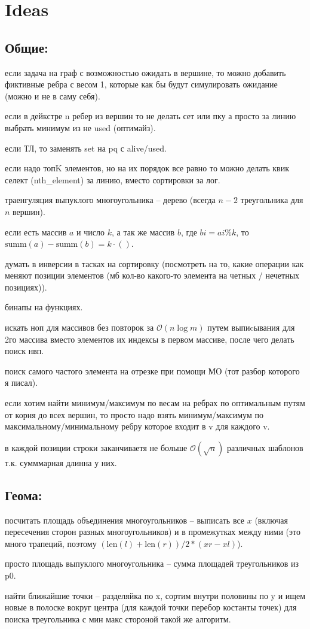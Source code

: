 \section{Ideas}
\subsection{Общие:}
\par если задача на граф с возможностью ожидать в вершине, то можно добавить фиктивные ребра с весом 1, которые как бы будут симулировать ожидание (можно и не в саму себя).
\par если в дейкстре n ребер из вершин то не делать сет или пку а просто за линию выбрать минимум из не used (оптимайз).
\par если ТЛ, то заменять set на pq с alive/used.
\par если надо топK элементов, но на их порядок все равно то можно делать квик селект (nth_element) за линию, вместо сортировки за лог.
\par траенгуляция выпуклого многоугольника -- дерево (всегда $n - 2$ треугольника для $n$ вершин).
\par если есть массив $a$ и число $k$, а так же массив $b$, где $bi = ai \% k$, то $\text{summ}(a) - \text{summ}(b) = k \cdot ()$.
\par думать в инверсии в тасках на сортировку (посмотреть на то, какие операции как меняют позиции элементов (мб кол-во какого-то элемента на четных / нечетных позициях)).
\par бинапы на функциях.
\par искать ноп для массивов без повторок за $\mathcal{O}(n \log m)$ путем выпиcывания для 2го массива вместо элементов их индексы в первом массиве, после чего делать поиск нвп.
\par поиск самого частого элемента на отрезке при помощи МО (тот разбор которого я писал).
\par если хотим найти минимум/максимум по весам на ребрах по оптимальным путям от корня до всех вершин, то просто надо взять минимум/максимум по максимальному/минимальному ребру которое входит в v для каждого v.
\par в каждой позиции строки заканчиваетя не больше $\mathcal{O}(\sqrt{n})$ различных шаблонов т.к. сумммарная длинна у них.
\subsection{Геома:}
\par посчитать площадь объединения многоугольников -- выписать все $x$ (включая пересечения сторон разных многоугольников) и в промежутках между ними (это много трапеций, поэтому  $(\text{len}(l) + \text{len}(r)) / 2 * (xr - xl)$).
\par просто площадь выпуклого многоугольника -- сумма площадей треугольников из p0.
\par найти ближайшие точки -- разделяйка по x, сортим внутри половины по y и ищем новые в полоске вокруг центра (для каждой точки перебор костанты точек)
для поиска треугольника с мин макс стороной такой же алгоритм.

